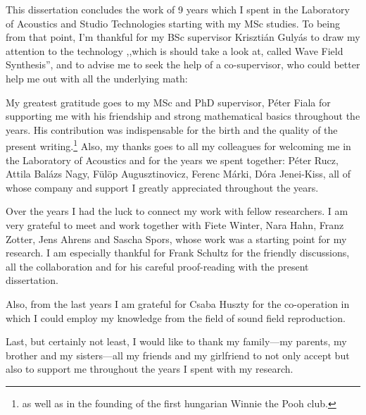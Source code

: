 This dissertation concludes the work of 9 years which I spent in the Laboratory of Acoustics and Studio Technologies starting with my MSc studies.
To being from that point, I'm thankful for my BSc supervisor Krisztián Gulyás to draw my attention to the technology ,,which is should take a look at, called Wave Field Synthesis'', and to advise me to seek the help of a co-supervisor, who could better help me out with all the underlying math:

My greatest gratitude goes to my MSc and PhD supervisor, Péter Fiala for supporting me with his friendship and strong mathematical basics throughout the years.
His contribution was indispensable for the birth and the quality of the present writing.\footnote{ as well as in the founding of the first hungarian Winnie the Pooh club.}
Also, my thanks goes to all my colleagues for welcoming me in the Laboratory of Acoustics and for the years we spent together: Péter Rucz, Attila Balázs Nagy, Fülöp Augusztinovicz, Ferenc Márki, Dóra Jenei-Kiss, all of whose company and support I greatly appreciated throughout the years.

Over the years I had the luck to connect my work with fellow researchers.
I am very grateful to meet and work together with Fiete Winter, Nara Hahn, Franz Zotter, Jens Ahrens and Sascha Spors, whose work was a starting point for my research.
I am especially thankful for Frank Schultz for the friendly discussions, all the collaboration and for his careful proof-reading with the present dissertation.

Also, from the last years I am grateful for Csaba Huszty for the co-operation in which I could employ my knowledge from the field of sound field reproduction.

Last, but certainly not least, I would like to thank my family---my parents, my brother and my sisters---all my friends and my girlfriend to not only accept but also to support me throughout the years I spent with my research.


%
